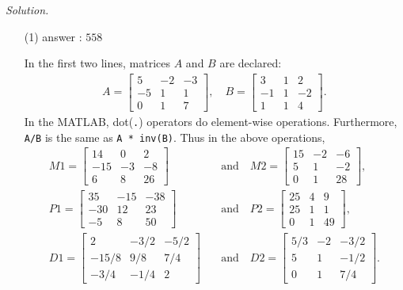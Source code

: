 \documentclass[11pt,a4paper]{article}
\begin{document}
\textit{Solution.}
\begin{enumerate}
    \item[(1)] answer : $558$
    
    \vspace{2mm}
    
    In the first two lines, matrices $A$ and $B$ are declared:
    \begin{align*}
        A =
        \begin{bmatrix}
            5 & -2 & -3\\ -5 & 1 & 1\\ 0 & 1 & 7
        \end{bmatrix}
        ,\quad
        B = 
        \begin{bmatrix}
            3 & 1 & 2\\ -1 & 1 & -2\\ 1 & 1 & 4
        \end{bmatrix}.
    \end{align*}
    In the MATLAB, dot(\verb".") operators do element-wise operations. Furthermore, \verb"A/B" is the same as \verb"A * inv(B)". Thus in the above operations,
    \begin{align*}
        M1 =
        \begin{bmatrix}
            14 & 0 & 2\\ -15 & -3 & -8\\ 6 & 8 & 26
        \end{bmatrix}
        \quad &\mbox{and}\quad
        M2 = 
        \begin{bmatrix}
            15 & -2 & -6\\ 5 & 1 & -2\\ 0 & 1 & 28
        \end{bmatrix},\\
        P1 =
        \begin{bmatrix}
            35 & -15 & -38\\ -30 & 12 & 23\\ -5 & 8 & 50
        \end{bmatrix}
        \quad &\mbox{and}\quad
        P2 = 
        \begin{bmatrix}
            25 & 4 & 9\\ 25 & 1 & 1\\ 0 & 1 & 49
        \end{bmatrix},\\
        D1 =
        \begin{bmatrix}
            2 & -3/2 & -5/2\\
            -15/8 & 9/8 & 7/4\\
            -3/4 & -1/4 & 2
        \end{bmatrix}
        \quad &\mbox{and}\quad
        D2 = 
        \begin{bmatrix}
            5/3 & -2 & -3/2\\
            5 & 1 & -1/2\\
            0 & 1 & 7/4
        \end{bmatrix}.
    \end{align*}


\end{enumerate}
\end{document}
